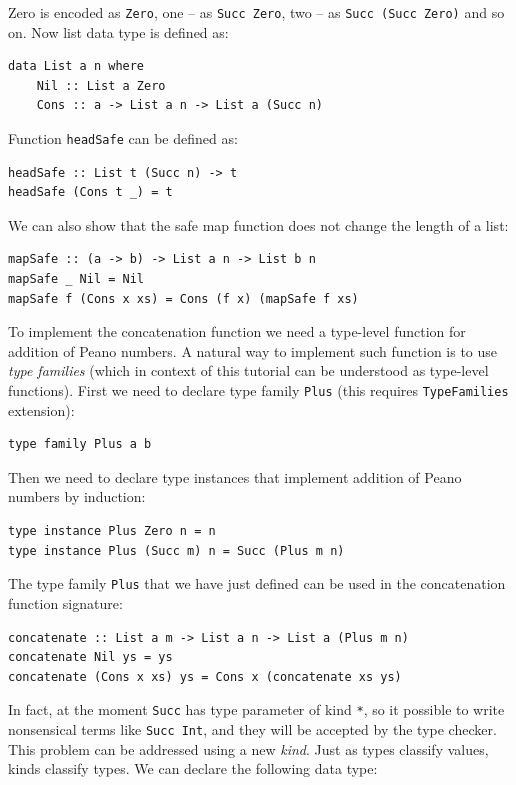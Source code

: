 \documentclass{tmr}
\newcommand{\italic}[1]{\textit{#1}}
\begin{document}
Zero is encoded as \verb|Zero|, one -- as \verb|Succ Zero|, two -- as \verb|Succ (Succ Zero)| and so on. Now list data type is defined as:

\begin{Verbatim}
data List a n where
    Nil :: List a Zero
    Cons :: a -> List a n -> List a (Succ n)
\end{Verbatim}

Function \verb|headSafe| can be defined as:

\begin{Verbatim}
headSafe :: List t (Succ n) -> t
headSafe (Cons t _) = t 
\end{Verbatim}

We can also show that the safe map function does not change the length of a list:

\begin{Verbatim}
mapSafe :: (a -> b) -> List a n -> List b n
mapSafe _ Nil = Nil
mapSafe f (Cons x xs) = Cons (f x) (mapSafe f xs) 
\end{Verbatim}

To implement the concatenation function we need a type-level function for addition of Peano numbers. A natural way to implement such function is to use \italic{type families} (which in context of this tutorial can be understood as type-level functions). First we need to declare type family \verb|Plus| (this requires \verb|TypeFamilies| extension):

\begin{Verbatim}
type family Plus a b
\end{Verbatim}

Then we need to declare type instances that implement addition of Peano numbers by induction:

\begin{Verbatim}
type instance Plus Zero n = n
type instance Plus (Succ m) n = Succ (Plus m n)
\end{Verbatim}

The type family \verb|Plus| that we have just defined can be used in the concatenation function signature:

\begin{Verbatim}
concatenate :: List a m -> List a n -> List a (Plus m n)
concatenate Nil ys = ys
concatenate (Cons x xs) ys = Cons x (concatenate xs ys)
\end{Verbatim}


In fact, at the moment \verb|Succ| has type parameter of kind \verb|*|, so it possible to write nonsensical terms like \verb|Succ Int|, and they will be accepted by the type checker. This problem can be addressed using a new \italic{kind}. Just as types classify values, kinds classify types. We can declare the following data type:
\end{document}
